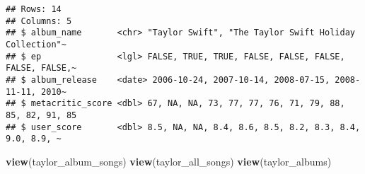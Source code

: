 \documentclass[
]{article}
\newenvironment{Shaded}{\begin{snugshade}}{\end{snugshade}}
\newcommand{\FunctionTok}[1]{\textcolor[rgb]{0.13,0.29,0.53}{\textbf{#1}}}
\newcommand{\NormalTok}[1]{#1}
\begin{document}
\begin{verbatim}
## Rows: 14
## Columns: 5
## $ album_name       <chr> "Taylor Swift", "The Taylor Swift Holiday Collection"~
## $ ep               <lgl> FALSE, TRUE, TRUE, FALSE, FALSE, FALSE, FALSE, FALSE,~
## $ album_release    <date> 2006-10-24, 2007-10-14, 2008-07-15, 2008-11-11, 2010~
## $ metacritic_score <dbl> 67, NA, NA, 73, 77, 77, 76, 71, 79, 88, 85, 82, 91, 85
## $ user_score       <dbl> 8.5, NA, NA, 8.4, 8.6, 8.5, 8.2, 8.3, 8.4, 9.0, 8.9, ~
\end{verbatim}

\begin{Shaded}
\begin{Highlighting}[]
\FunctionTok{view}\NormalTok{(taylor\_album\_songs)}
\FunctionTok{view}\NormalTok{(taylor\_all\_songs)}
\FunctionTok{view}\NormalTok{(taylor\_albums)}
\end{Highlighting}
\end{Shaded}
\end{document}

